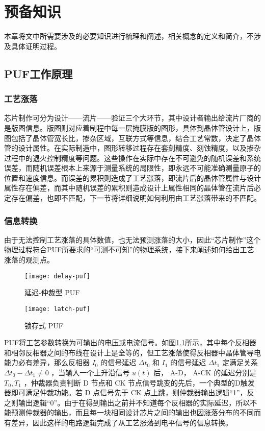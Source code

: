 
\chapter{预备知识}\label{chap:preliminary}
本章将文中所需要涉及的必要知识进行梳理和阐述，相关概念的定义和简介，不涉及具体证明过程。

\section{PUF工作原理}%
\subsection{工艺涨落}%
芯片制作可分为设计——流片——验证三个大环节，其中设计者输出给流片厂商的是版图信息。版图则对应着制程中每一层掩膜版的图形，具体到晶体管设计上，版图包括了晶体管宽长比，掺杂区域，互联方式等信息，结合工艺常数，决定了晶体管的设计属性。在实际制造中，图形转移过程存在套刻精度、刻蚀精度，以及掺杂过程中的退火控制精度等问题。这些操作在实际中存在不可避免的随机误差和系统误差，而随机误差根本上来源于测量系统的局限性，即永远不可能准确测量原子的位置和速度信息。而误差的累积则造成了工艺涨落，即流片后的晶体管属性与设计属性存在偏差，而其中随机误差的累积则造成设计上属性相同的晶体管在流片后必定存在偏差，也即不匹配，下一节将详细说明如何利用由工艺涨落带来的不匹配。
\subsection{信息转换}
由于无法控制工艺涨落的具体数值，也无法预测涨落的大小，因此``芯片制作''这个物理过程符合PUF所要求的``可测不可知''的物理系统，接下来阐述如何给出工艺涨落的观测点。

\begin{figure}[htb!]
\centering
\texttt{[image: delay-puf]}
\caption{延迟-仲裁型 PUF}
\label{fig:delay-puf}
\end{figure}
 
 \begin{figure}[htb!]
 \centering
 \texttt{[image: latch-puf]}
 \caption{锁存式 PUF}
 \label{fig:latch-puf}
 \end{figure}

PUF将工艺参数转换为可输出的电压或电流信号。如图\ref{fig:delay-puf}所示，其中每个反相器和相邻反相器之间的布线在设计上是全等的，但工艺涨落使得反相器中晶体管导电能力必有差异，那么反相器 $ I_0 $ 的信号延迟 $ \Delta t_0 $ 和 $ I_1 $ 的信号延迟 $ \Delta t_1 $ 定满足关系 $ \Delta t_0-\Delta t_1\neq 0 $ ，当输入一个上升沿信号 $ u(t) $ 后， A-D， A-CK  的延迟分别是 $ T_0,T_1 $ ，仲裁器负责判断 D 节点和 CK 节点信号跳变的先后，一个典型的D触发器即可满足仲裁功能。若 D 点信号先于 CK 点上跳，则仲裁器输出逻辑``1''，反之则输出逻辑``0''。由于在得到输出之前并不知道每个反相器的实际延迟，所以不能预测仲裁器的输出，而且每一块相同设计芯片之间的输出也因涨落分布的不同而有差异，因此这样的电路逻辑完成了从工艺涨落到电平信号的信息转换。


